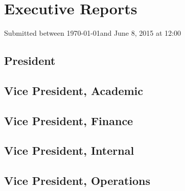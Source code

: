 
\section*{Executive Reports}
Submitted between \today and June 8, 2015 at 12:00

\subsection*{President}
\label{sec:president}


\subsection*{Vice President, Academic}
\label{sec:vpacademic}


\subsection*{Vice President, Finance}
\label{sec:vpfinance}


\subsection*{Vice President, Internal}
\label{sec:vpinternal}


\subsection*{Vice President, Operations}
\label{sec:vpoperations}
